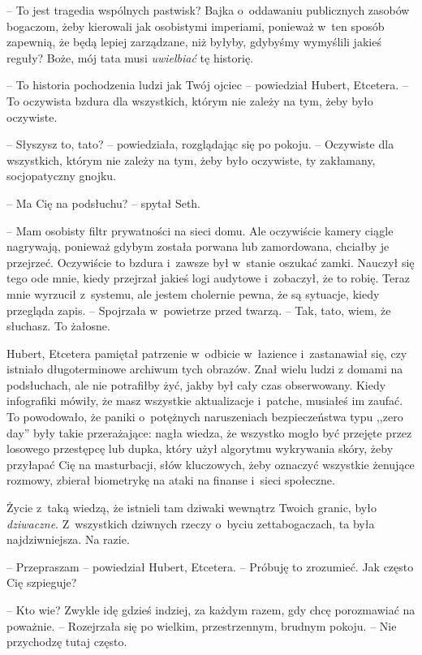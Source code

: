 \documentclass[oneside,polish,11pt,sfheadings]{mwbk}
\begin{document}
-- To jest tragedia wspólnych pastwisk? Bajka o~oddawaniu publicznych
zasobów bogaczom, żeby kierowali jak osobistymi imperiami, ponieważ w~ten sposób zapewnią, że będą lepiej zarządzane, niż byłyby, gdybyśmy
wymyślili jakieś reguły? Boże, mój tata musi \textit{uwielbiać} tę
historię.

-- To historia pochodzenia ludzi jak Twój ojciec -- powiedział Hubert,
Etcetera. -- To oczywista bzdura dla wszystkich, którym nie zależy na
tym, żeby było oczywiste.

-- Słyszysz to, tato? -- powiedziała, rozglądając się po pokoju. -- Oczywiste dla wszystkich, którym nie zależy na tym, żeby było oczywiste,
ty zakłamany, socjopatyczny gnojku.

-- Ma Cię na podsłuchu? -- spytał Seth.

-- Mam osobisty filtr prywatności na sieci domu. Ale oczywiście kamery
ciągle nagrywają, ponieważ gdybym została porwana lub zamordowana,
chciałby je przejrzeć. Oczywiście to bzdura i~zawsze był w~stanie
oszukać zamki. Nauczył się tego ode mnie, kiedy przejrzał jakieś logi
audytowe i~zobaczył, że to robię. Teraz mnie wyrzucił z~systemu, ale
jestem cholernie pewna, że są sytuacje, kiedy przegląda zapis. -- Spojrzała w~powietrze przed twarzą. -- Tak, tato, wiem, że słuchasz. To
żałosne.

Hubert, Etcetera pamiętał patrzenie w~odbicie w~łazience i~zastanawiał
się, czy istniało długoterminowe archiwum tych obrazów. Znał wielu ludzi
z domami na podsłuchach, ale nie potrafiłby żyć, jakby był cały czas
obserwowany. Kiedy infografiki mówiły, że masz wszystkie aktualizacje i~patche, musiałeś im zaufać. To powodowało, że paniki o~potężnych
naruszeniach bezpieczeństwa typu ,,zero day'' były takie przerażające:
nagła wiedza, że wszystko mogło być przejęte przez losowego przestępcę
lub dupka, który użył algorytmu wykrywania skóry, żeby przyłapać Cię na
masturbacji, słów kluczowych, żeby oznaczyć wszystkie żenujące rozmowy,
zbierał biometrykę na ataki na finanse i~sieci społeczne.

Życie z~taką wiedzą, że istnieli tam dziwaki wewnątrz Twoich granic,
było \textit{dziwaczne}. Z~wszystkich dziwnych rzeczy o~byciu
zettabogaczach, ta była najdziwniejsza. Na razie.

-- Przepraszam -- powiedział Hubert, Etcetera. -- Próbuję to zrozumieć. Jak
często Cię szpieguje?

-- Kto wie? Zwykle idę gdzieś indziej, za każdym razem, gdy chcę
porozmawiać na poważnie. -- Rozejrzała się po wielkim, przestrzennym,
brudnym pokoju. -- Nie przychodzę tutaj często.
\end{document}
